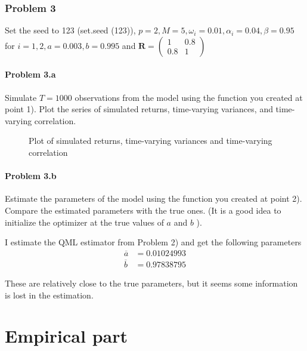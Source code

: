 \documentclass{EconHomework}
\begin{document}
\pagebreak

\section{Problem 3}
Set the seed to 123 (set.seed (123)), $p=2, M=5, \omega_{i}=0.01, \alpha_{i}=0.04, \beta=0.95$ for $i=1,2, a=0.003, b=0.995$ and $\mathbf{R}=\left(\begin{array}{cc}1 & 0.8 \\ 0.8 & 1\end{array}\right)$

\subsection{Problem 3.a}
\begin{tcolorbox}[colback=white]
    Simulate $T=1000$ observations from the model using the function you created at point 1). Plot the series of simulated returns, time-varying variances, and time-varying correlation.
\end{tcolorbox}

\begin{figure}[htbp]
  \centering
  
  \caption{Plot of simulated returns, time-varying variances and time-varying correlation}
\end{figure}

\subsection{Problem 3.b}
\begin{tcolorbox}[colback=white]
    Estimate the parameters of the model using the function you created at point 2). Compare the estimated parameters with the true ones. (It is a good idea to initialize the optimizer at the true values of $a$ and $b$ ).
\end{tcolorbox}

I estimate the QML estimator from Problem 2) and get the following parameters
\begin{align*}
    \overline{a}&=0.01024993 \\
    \overline{b}&=0.97838795 
\end{align*}

These are relatively close to the true parameters, but it seems some information is lost in the estimation.

\pagebreak
\setcounter{section}{0}
\part*{Empirical part}
\end{document}
